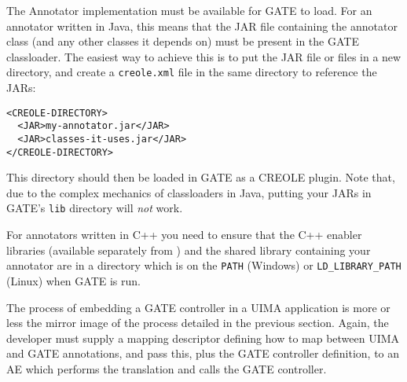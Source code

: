 The Annotator implementation must be available for GATE to load.  For an
annotator written in Java, this means that the JAR file containing the
annotator class (and any other classes it depends on) must be present in the
GATE classloader.  The easiest way to achieve this is to put the JAR file or
files in a new directory, and create a \texttt{creole.xml} file in the same
directory to reference the JARs:
\begin{small}
\begin{verbatim}
<CREOLE-DIRECTORY>
  <JAR>my-annotator.jar</JAR>
  <JAR>classes-it-uses.jar</JAR>
</CREOLE-DIRECTORY>
\end{verbatim}
\end{small}
%
This directory should then be loaded in GATE as a CREOLE plugin.  Note that,
due to the complex mechanics of classloaders in Java, putting your JARs in
GATE's \texttt{lib} directory will \emph{not} work.

For annotators written in C++ you need to ensure that the C++ enabler libraries
(available separately from )
and the shared library containing your annotator are in a directory which is on
the \texttt{PATH} (Windows) or \texttt{LD\_LIBRARY\_PATH} (Linux) when GATE is
run.


The process of embedding a GATE controller in a UIMA application is more or
less the mirror image of the process detailed in the previous section.  Again,
the developer must supply a mapping descriptor defining how to map between UIMA
and GATE annotations, and pass this, plus the GATE controller definition, to an
AE which performs the translation and calls the GATE controller.


